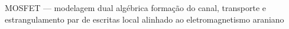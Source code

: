 \documentclass[11pt,a4paper]{article}
\providecommand{\interfacen}[1]{}
\begin{document}
\interfacen{6}

\gkcapa
  {MOSFET --- modelagem dual algébrica}
  {formação do canal, transporte e estrangulamento}
  {par de escritas local alinhado ao eletromagnetismo araniano}

\maketitle

\begin{abstract}
\noindent

\end{abstract}
\end{document}
